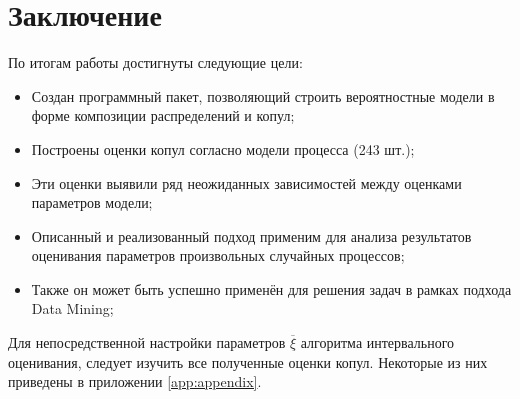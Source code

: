 \chapter*{Заключение}	%

По итогам работы достигнуты следующие цели:
\begin{itemize}
  \item Создан программный пакет, позволяющий строить вероятностные модели в форме композиции распределений и копул;
  \item Построены оценки копул согласно модели процесса (243 шт.);
  \item Эти оценки выявили ряд неожиданных зависимостей между оценками параметров модели;
  \item Описанный и реализованный подход применим для анализа результатов оценивания параметров произвольных случайных процессов;
  \item Также он может быть успешно применён для решения задач в рамках подхода Data Mining;
\end{itemize}

Для непосредственной настройки параметров $\overline{\xi}$ алгоритма интервального оценивания, следует изучить все полученные оценки копул. Некоторые из них приведены в приложении \ref{app:appendix}.

\clearpage
